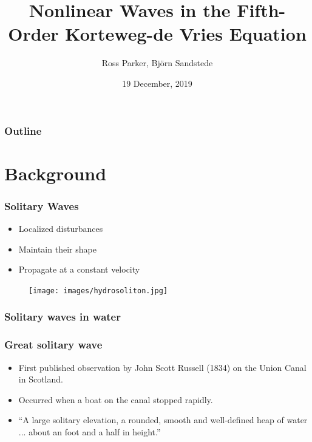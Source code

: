 \documentclass[16pt]{beamer}
\title[5th order KdV Equation]{Nonlinear Waves in the Fifth-Order Korteweg-de Vries Equation}
\author[R. Parker]{Ross Parker, Bj\"{o}rn Sandstede}
\institute{Brown University}
\date{19 December, 2019}
\begin{document}
 
\frame{\titlepage}
 
\begin{frame}
\frametitle{Outline}
\tableofcontents
\end{frame}

\section{Background}

\begin{frame}
	\frametitle{ Solitary Waves } 
	\fontsize{16}{7.2}\selectfont
	\begin{itemize}
		\item Localized disturbances 
		\vspace{0.5cm}
		\item Maintain their shape
		\vspace{0.5cm}
		\item Propagate at a constant velocity
	\end{itemize}
	\begin{figure}[H]
	\centering
	\texttt{[image: images/hydrosoliton.jpg]}
	\end{figure}
\end{frame}

\begin{frame}
	\frametitle{Solitary waves in water}
	\fontsize{16}{7.2}\selectfont
	\begin{center}
	\end{center}
\end{frame}

\begin{frame}
	\frametitle{ Great solitary wave }   
	\fontsize{16}{7.2}\selectfont
	\begin{itemize}
		\item First published observation by John Scott Russell (1834) on the Union Canal in Scotland.
		\vspace{0.5cm}
		\item Occurred when a boat on the canal stopped rapidly.
		\vspace{0.5cm}
		\item ``A large solitary elevation, a rounded, smooth and well-defined heap of water ...  about an foot and a half in height.''
	\end{itemize}
\end{frame}
\end{document}
